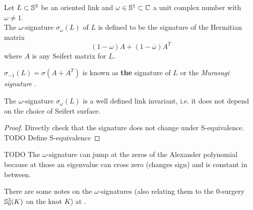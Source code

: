 \begin{definition}
	Let $L \subset \mathbb{S}^{3}$ be an oriented link and
	$\omega \in \mathbb{S}^{1} \subset \mathbb{C}$
	a unit complex number with $\omega \ne 1$. \\
	The $\omega$-signature $\sigma_{\omega}(L)$ of $L$
	is defined to be the signature of the Hermitian matrix
	\begin{equation*}
		(1 - \omega) A + (1 - \overline{\omega}) A^{T}
	\end{equation*}
	where $A$ is any Seifert matrix for $L$.
\end{definition}

\begin{definition}
	$\sigma_{-1}(L) = \sigma(A + A^{T})$
	is known as \textbf{the} signature of $L$
	or the \textit{Murasugi signature} .
\end{definition}

\begin{theorem}
	The $\omega$-signature $\sigma_{\omega}(L)$ is a well defined link invariant,
	i.e. it does not depend on the choice of Seifert surface.
\end{theorem}

\begin{proof}
	Directly check that the signature does not change under S-equivalence.
	TODO Define S-equivalence
\end{proof}

TODO The $\omega$-signature can jump at the zeros of the Alexander polynomial
because at those an eigenvalue can cross zero (changes sign)
and is constant in between.

There are some notes on the $\omega$-signatures
(also relating them to the $0$-surgery $\mathbb{S}^{3}_{0}(K)$
on the knot $K$) at \citep{conway2018notes}.





